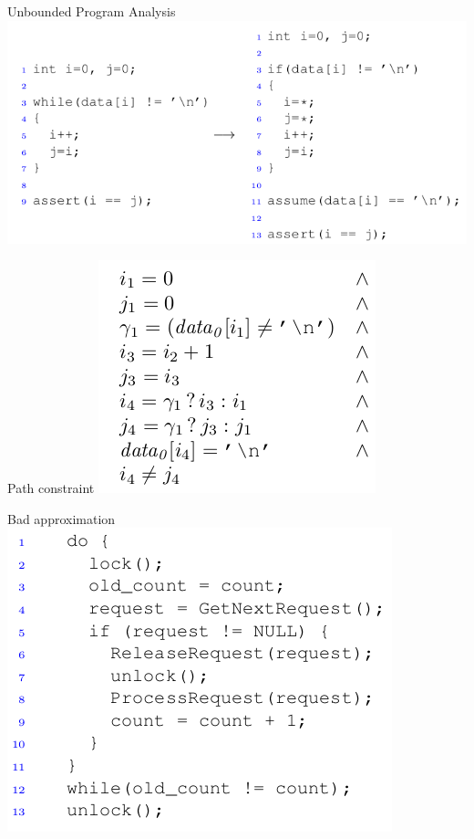 \documentclass{beamer}
\begin{document}
\begin{frame}{Unbounded Program Analysis}
\includegraphics[scale=0.5]{unbounded_program_analysis.png}
\end{frame}

\begin{frame}{Path constraint}
\includegraphics[scale=0.5]{path_constraint3.png}
\end{frame}

\begin{frame}{Bad approximation}
\includegraphics[scale=0.5]{example3.png}
\end{frame}
\end{document}
